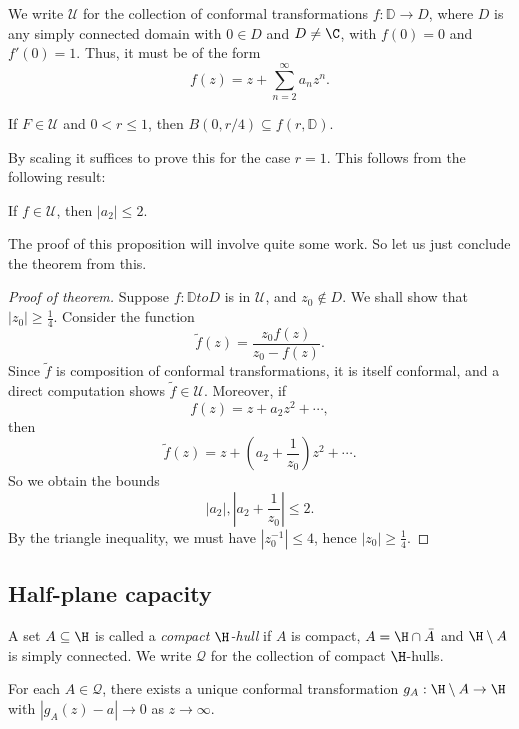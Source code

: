 \documentclass[a4paper]{article}
\renewcommand\D{\mathbb{D}}
\begin{document}
We write $\mathcal{U}$ for the collection of conformal transformations $f: \D \to D$, where $D$ is any simply connected domain with $0 \in D$ and $D \not= \C$, with $f(0) = 0$ and $f'(0) = 1$. Thus, it must be of the form
\[
  f(z) = z + \sum_{n = 2}^\infty a_n z^n.
\]
\begin{thm}
  If $F \in \mathcal{U}$ and $0 < r \leq 1$, then $B(0, r/4) \subseteq f(r, \D)$.
\end{thm}
By scaling it suffices to prove this for the case $r = 1$. This follows from the following result:
\begin{prop}
  If $f \in \mathcal{U}$, then $|a_2| \leq 2$.
\end{prop}
The proof of this proposition will involve quite some work. So let us just conclude the theorem from this.
\begin{proof}[Proof of theorem]
  Suppose $f: \D to D$ is in $\mathcal{U}$, and $z_0 \not \in D$. We shall show that $|z_0| \geq \frac{1}{4}$. Consider the function
  \[
    \tilde{f}(z) = \frac{z_0 f(z)}{z_0 - f(z)}.
  \]
  Since $\tilde{f}$ is composition of conformal transformations, it is itself conformal, and a direct computation shows $\tilde{f} \in \mathcal{U}$. Moreover, if
  \[
    f(z) = z + a_2 z^2 + \cdots,
  \]
  then
  \[
    \tilde{f}(z) = z + \left(a_2 + \frac{1}{z_0}\right)z^2 + \cdots.
  \]
  So we obtain the bounds
  \[
    |a_2|, \left|a_2 + \frac{1}{z_0}\right| \leq 2.
  \]
  By the triangle inequality, we must have $|z_0^{-1}| \leq 4$, hence $|z_0| \geq \frac{1}{4}$.
\end{proof}


\subsection{Half-plane capacity}
\begin{defi}
  A set $A \subseteq \H$ is called a \emph{compact $\H$-hull} if $A$ is compact, $A = \H \cap \bar{A}$ and $\H \setminus A$ is simply connected. We write $\mathcal{Q}$ for the collection of compact $\H$-hulls.
\end{defi}

\begin{prop}
  For each $A \in \mathcal{Q}$, there exists a unique conformal transformation $g_A: \H \setminus A \to \H$ with $|g_A(z) - a| \to 0$ as $z \to \infty$.
\end{prop}
\end{document}
